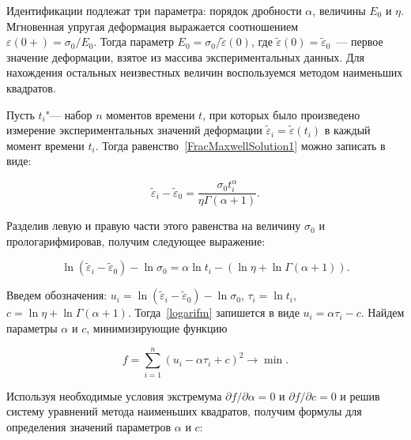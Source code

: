 \documentclass[11pt,a4paper,twoside]{article}
\begin{document}
Идентификации подлежат три параметра: порядок дробности $\alpha$, величины $E_{0}$ и $\eta$. Мгновенная упругая деформация выражается соотношением\\


$\varepsilon(0+)=\sigma_{0}/E_{0}$. Тогда параметр $E_{0}=\sigma_{0}/\tilde{\varepsilon}(0)$, где $\tilde{\varepsilon}(0)=\tilde{\varepsilon}_{0}$~--- первое значение деформации, взятое из массива экспериментальных данных. Для нахождения остальных неизвестных величин воспользуемся методом наименьших квадратов.





Пусть $t_{i}$"--- набор $n$ моментов времени $t$, при которых было произведено измерение экспериментальных значений деформации  $\tilde{\varepsilon}_{i}=\tilde{\varepsilon}(t_{i})$ в каждый момент времени $t_{i}$. Тогда равенство~\eqref{FracMaxwellSolution1} можно записать в виде:


\begin{equation*} 


\tilde{\varepsilon}_{i}-\tilde{\varepsilon}_{0}=\frac{\sigma_{0}t^{\alpha}_{i}}{\eta\Gamma(\alpha+1)}.


\end{equation*}


Разделив левую и правую части этого равенства на величину $\sigma_{0}$ и прологарифмировав, получим следующее выражение:


\begin{equation} \label{logarifm}


\ln(\tilde{\varepsilon}_{i}-\tilde{\varepsilon}_{0})-\ln\sigma_{0}=\alpha\ln t_{i}-(\ln\eta+\ln\Gamma(\alpha+1)). 


\end{equation} 


Введем обозначения: $u_{i}=\ln(\tilde{\varepsilon}_{i}-\tilde{\varepsilon}_{0})-\ln\sigma_{0}$, $\tau_{i}=\ln t_{i}$, $c=\ln \eta+\ln \Gamma(\alpha+1)$. Тогда~\eqref{logarifm} запишется в виде $u_{i}=\alpha\tau_{i}-c$. Найдем параметры $\alpha$ и $c$, минимизирующие функцию


\begin{equation} \label{function2}


f=\sum^{n}_{i=1}(u_{i}-\alpha\tau_{i}+c)^{2} \rightarrow \min.


\end{equation}





Используя необходимые условия экстремума ${\partial f}/{\partial\alpha}=0$ и ${\partial f}/{\partial c}=0$ и решив систему уравнений метода наименьших квадратов, получим формулы для определения значений параметров  $\alpha$ и $c$:
\end{document}
